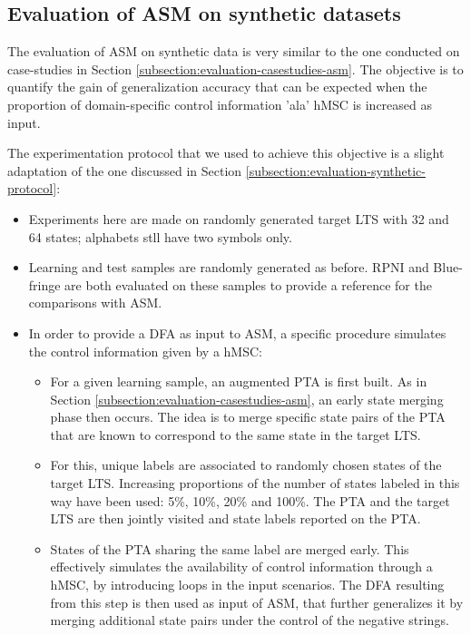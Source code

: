 \subsection{Evaluation of ASM on synthetic datasets\label{subsection:evaluation-synthetic-asm}}

The evaluation of ASM on synthetic data is very similar to the one conducted on case-studies in Section \ref{subsection:evaluation-casestudies-asm}. The objective is to quantify the gain of generalization accuracy that can be expected when the proportion of domain-specific control information 'ala' hMSC is increased as input. 

The experimentation protocol that we used to achieve this objective is a slight adaptation of the one discussed in Section \ref{subsection:evaluation-synthetic-protocol}:
\begin{itemize}
\item Experiments here are made on randomly generated target LTS with 32 and 64 states; alphabets stll have two symbols only.
\item Learning and test samples are randomly generated as before. RPNI and Blue-fringe are both evaluated on these samples to provide a reference for the comparisons with ASM.  
\item In order to provide a DFA as input to ASM, a specific procedure simulates the control information given by a hMSC:
\begin{itemize}
\item For a given learning sample, an augmented PTA is first built. As in Section \ref{subsection:evaluation-casestudies-asm}, an early state merging phase then occurs. The idea is to merge specific state pairs of the PTA that are known to correspond to the same state in the target LTS.
\item For this, unique labels are associated to randomly chosen states of the target LTS. Increasing proportions of the number of states labeled in this way have been used: 5\%, 10\%, 20\% and 100\%. The PTA and the target LTS are then jointly visited and state labels reported on the PTA. 
\item States of the PTA sharing the same label are merged early. This effectively simulates the availability of control information through a hMSC, by introducing loops in the input scenarios. The DFA resulting from this step is then used as input of ASM, that further generalizes it by merging additional state pairs under the control of the negative strings.
\end{itemize}
\end{itemize}
 

